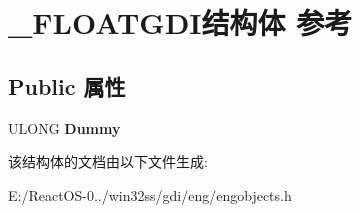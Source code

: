 \hypertarget{struct___f_l_o_a_t_g_d_i}{}\section{\+\_\+\+F\+L\+O\+A\+T\+G\+D\+I结构体 参考}
\label{struct___f_l_o_a_t_g_d_i}
\subsection*{Public 属性}
\begin{DoxyCompactItemize}
\item 
\mbox{\label{struct___f_l_o_a_t_g_d_i_ac016422d0ce8132d5a7ffd5d5f0e5a6b}} 
U\+L\+O\+NG {\bfseries Dummy}
\end{DoxyCompactItemize}


该结构体的文档由以下文件生成\+:\begin{DoxyCompactItemize}
\item 
E\+:/\+React\+O\+S-\/0../win32ss/gdi/eng/engobjects.\+h\end{DoxyCompactItemize}
